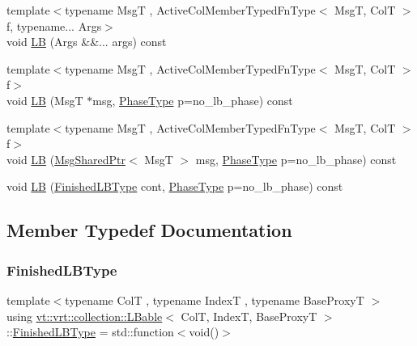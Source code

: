 \begin{DoxyCompactItemize}
{\footnotesize template$<$typename MsgT , Active\+Col\+Member\+Typed\+Fn\+Type$<$ Msg\+T, Col\+T $>$ f, typename... Args$>$ }\\void \hyperlink{structvt_1_1vrt_1_1collection_1_1_l_bable_ae7160fcd27761fb849d20ff440445cd7}{LB} (Args \&\&... args) const
\item 
{\footnotesize template$<$typename MsgT , Active\+Col\+Member\+Typed\+Fn\+Type$<$ Msg\+T, Col\+T $>$ f$>$ }\\void \hyperlink{structvt_1_1vrt_1_1collection_1_1_l_bable_ab02f5bd0f16e318a8bdd4befe1819e74}{LB} (MsgT $\ast$msg, \hyperlink{namespacevt_a46ce6733d5cdbd735d561b7b4029f6d7}{Phase\+Type} p=no\+\_\+lb\+\_\+phase) const
\item 
{\footnotesize template$<$typename MsgT , Active\+Col\+Member\+Typed\+Fn\+Type$<$ Msg\+T, Col\+T $>$ f$>$ }\\void \hyperlink{structvt_1_1vrt_1_1collection_1_1_l_bable_a2a7f68f0b6a004bc7cb414ef0d94bbc5}{LB} (\hyperlink{namespacevt_ab2b3d506ec8e8d1540aede826d84a239}{Msg\+Shared\+Ptr}$<$ MsgT $>$ msg, \hyperlink{namespacevt_a46ce6733d5cdbd735d561b7b4029f6d7}{Phase\+Type} p=no\+\_\+lb\+\_\+phase) const
\item 
void \hyperlink{structvt_1_1vrt_1_1collection_1_1_l_bable_ad62a2e83466342f7efe23c7b97c56caa}{LB} (\hyperlink{structvt_1_1vrt_1_1collection_1_1_l_bable_a27cc10ccbf93ad3d794998c79f710a5a}{Finished\+L\+B\+Type} cont, \hyperlink{namespacevt_a46ce6733d5cdbd735d561b7b4029f6d7}{Phase\+Type} p=no\+\_\+lb\+\_\+phase) const
\end{DoxyCompactItemize}


\subsection{Member Typedef Documentation}
\mbox{\label{structvt_1_1vrt_1_1collection_1_1_l_bable_a27cc10ccbf93ad3d794998c79f710a5a}} 
\subsubsection{\texorpdfstring{Finished\+L\+B\+Type}{FinishedLBType}}
{\footnotesize\ttfamily template$<$typename ColT , typename IndexT , typename Base\+ProxyT $>$ \\
using \hyperlink{structvt_1_1vrt_1_1collection_1_1_l_bable}{vt\+::vrt\+::collection\+::\+L\+Bable}$<$ ColT, IndexT, Base\+ProxyT $>$\+::\hyperlink{structvt_1_1vrt_1_1collection_1_1_l_bable_a27cc10ccbf93ad3d794998c79f710a5a}{Finished\+L\+B\+Type} =  std\+::function$<$void()$>$}



